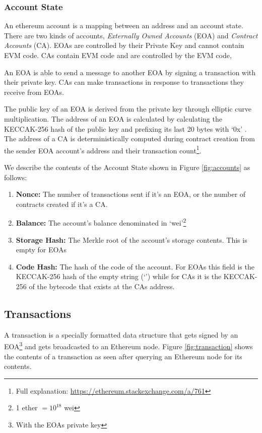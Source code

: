 

\subsubsection{Account State}
An ethereum account is a mapping between an address and an account state. There are two kinds of accounts, \textit{Externally Owned Accounts} (EOA) and \textit{Contract Accounts} (CA). EOAs are controlled by their Private Key and cannot contain EVM code. CAs contain EVM code and are controlled by the EVM code,



An EOA is able to send a message to another EOA by signing a transaction with their private key. CAs can make transactions in response to transactions they receive from EOAs. 



The public key of an EOA is derived from the private key through elliptic curve multiplication. The address of an EOA is calculated by calculating the KECCAK-256 hash of the public key and prefixing its last 20 bytes with `0x' \cite{ethereum}. The address of a CA is deterministically computed during contract creation from the sender EOA account's address and their transaction count\footnote{Full explanation: \url{https://ethereum.stackexchange.com/a/761}}.

We describe the contents of the Account State shown in Figure \ref{fig:accounts} as follows:
\begin{enumerate}
    \item \textbf{Nonce:} The number of transactions sent if it's an EOA, or the number of contracts created if it's a CA.
    \item \textbf{Balance:} The account's balance denominated in `wei'\footnote{1 ether $= 10^{18}$ wei }
    \item \textbf{Storage Hash:} The Merkle root of the account's storage contents. This is empty for EOAs
    \item \textbf{Code Hash:} The hash of the code of the account. For EOAs this field is the KECCAK-256 hash of the empty string (`') while for CAs it is the KECCAK-256 of the bytecode that exists at the CAs address.
\end{enumerate}

\subsection{Transactions} \label{transactions}
A transaction is a specially formatted data structure that gets signed by an EOA\footnote{With the EOAs private key} and gets broadcasted to an Ethereum node. Figure \ref{fig:transaction} shows the contents of a transaction as seen after querying an Ethereum node for its contents.

